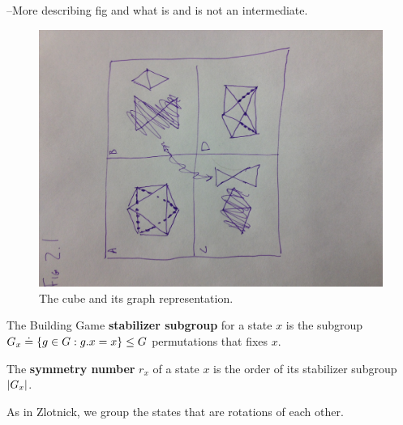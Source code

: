 --More describing fig and what is and is not an intermediate.


\begin{figure}[ht]
  \includegraphics[scale=0.1, angle=0]{fig_2_1.eps}
\caption{The cube and its graph representation.}
\label{fig:OctaStates}
\end{figure}


\begin{mydef}
The Building Game \textbf{stabilizer subgroup} for a state $x$ is the subgroup ${G}_x \doteq \left\{g \in {G} :g. x = x \right\} \leq {G}$ permutations that fixes $x$.
\end{mydef}

\begin{mydef}
The \textbf{symmetry number} $r_x$ of a state $x$ is the order of its stabilizer subgroup $\left|{G}_x\right|$.
\end{mydef}

As in Zlotnick, we group the states that are rotations of each other. 

